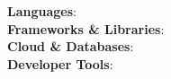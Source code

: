 
\begin{itemize}[leftmargin=0.15in, label={}]
   \small{\item{
    \textbf{Languages}{: \SkillsLanguages} \\
    \textbf{Frameworks \& Libraries}{: \SkillsFrameworks} \\
    \textbf{Cloud \& Databases}{: \SkillsCloud} \\
    \textbf{Developer Tools}{: \SkillsTools}
   }}
\end{itemize}
